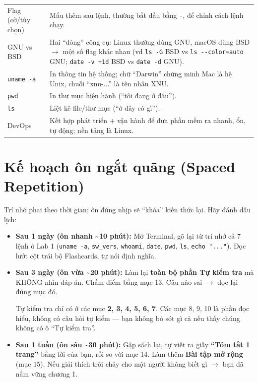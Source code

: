 \documentclass[12pt,a4paper]{article}
\begin{document}
\begin{longtable}{>{\raggedright\arraybackslash}p{4.2cm}>{\raggedright\arraybackslash}p{10.3cm}}
\rowcolor{cardrow}Flag (cờ/tùy chọn) & Mẩu thêm sau lệnh, thường bắt đầu bằng \texttt{-}, để chỉnh cách lệnh chạy. \\
GNU vs BSD & Hai ``dòng'' công cụ: Linux thường dùng GNU, macOS dùng BSD $\rightarrow$ một số flag khác nhau (vd \texttt{ls -G} BSD vs \texttt{ls -{}-color=auto} GNU; \texttt{date -v +1d} BSD vs \texttt{date -d} GNU). \\
\rowcolor{cardrow}\texttt{uname -a} & In thông tin hệ thống; chữ ``Darwin'' chứng minh Mac là hệ Unix, chuỗi ``xnu-...'' là tên nhân XNU. \\
\texttt{pwd} & In thư mục hiện hành (``tôi đang ở đâu''). \\
\rowcolor{cardrow}\texttt{ls} & Liệt kê file/thư mục (``ở đây có gì''). \\
DevOps & Kết hợp phát triển + vận hành để đưa phần mềm ra nhanh, ổn, tự động; nền tảng là Linux. \\
\end{longtable}

\section{Kế hoạch ôn ngắt quãng (Spaced Repetition)}

Trí nhớ phai theo thời gian; ôn đúng nhịp sẽ ``khóa'' kiến thức lại. Hãy đánh dấu lịch:

\begin{itemize}[leftmargin=*]
  \item \textbf{Sau 1 ngày (ôn nhanh \textasciitilde10 phút):} Mở Terminal, gõ lại từ trí nhớ cả 7 lệnh ở Lab 1 (\texttt{uname -a}, \texttt{sw\_vers}, \texttt{whoami}, \texttt{date}, \texttt{pwd}, \texttt{ls}, \texttt{echo "..."}). Đọc lướt cột trái bộ Flashcards, tự nói định nghĩa.
  \item \textbf{Sau 3 ngày (ôn vừa \textasciitilde20 phút):} Làm lại \textbf{toàn bộ phần Tự kiểm tra} mà KHÔNG nhìn đáp án. Chấm điểm bằng mục 13. Câu nào sai $\rightarrow$ đọc lại đúng mục đó.
  \begin{notebox}[Lưu ý]
  Tự kiểm tra chỉ có ở các mục \textbf{2, 3, 4, 5, 6, 7}. Các mục 8, 9, 10 là phần đọc hiểu, không có câu hỏi tự kiểm — bạn không bỏ sót gì cả nếu thấy chúng không có ô ``Tự kiểm tra''.
  \end{notebox}
  \item \textbf{Sau 1 tuần (ôn sâu \textasciitilde30 phút):} Gập sách lại, tự viết ra giấy \textbf{``Tóm tắt 1 trang''} bằng lời của bạn, rồi so với mục 14. Làm thêm \textbf{Bài tập mở rộng} (mục 15). Nếu giải thích trôi chảy cho một người không biết gì $\rightarrow$ bạn đã nắm vững chương 1.
\end{itemize}
\end{document}
